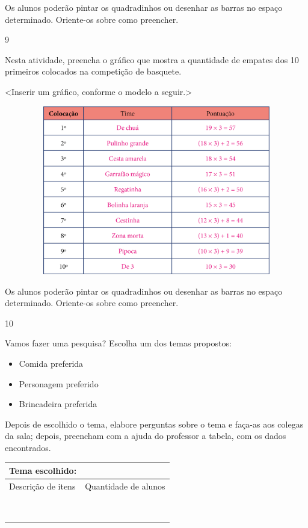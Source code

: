 {{{{{{{{{{{{{{{{{Os alunos poderão pintar os quadradinhos ou desenhar as barras no espaço determinado. Oriente-os sobre como preencher.

\num{9}

Nesta atividade, preencha o gráfico que mostra a quantidade de empates
dos 10 primeiros colocados na competição de basquete.

\textless{}Inserir um gráfico, conforme o modelo a seguir.\textgreater{}

\includegraphics[width=6.20833in,height=2.91016in]{media/image95.png}

Os alunos poderão pintar os quadradinhos ou desenhar as barras no espaço determinado. Oriente-os sobre como preencher.

\num{10}

Vamos fazer uma pesquisa? Escolha um dos temas propostos:

\begin{itemize}
\item
  Comida preferida
\item
  Personagem preferido
\item
  Brincadeira preferida
\end{itemize}

Depois de escolhido o tema, elabore perguntas sobre o tema e faça-as aos colegas da sala; depois,
preencham com a ajuda do professor a tabela, com os dados encontrados.

\begin{longtable}[]{@{}ll@{}}
\toprule
Tema escolhido:\tabularnewline
\midrule
\endhead
Descrição de itens & Quantidade de alunos\tabularnewline
&\tabularnewline
&\tabularnewline
&\tabularnewline
&\tabularnewline
&\tabularnewline
&\tabularnewline
&\tabularnewline
&\tabularnewline
&\tabularnewline
\bottomrule
\end{longtable}


}}}}}}}}}}}}}}}}}
